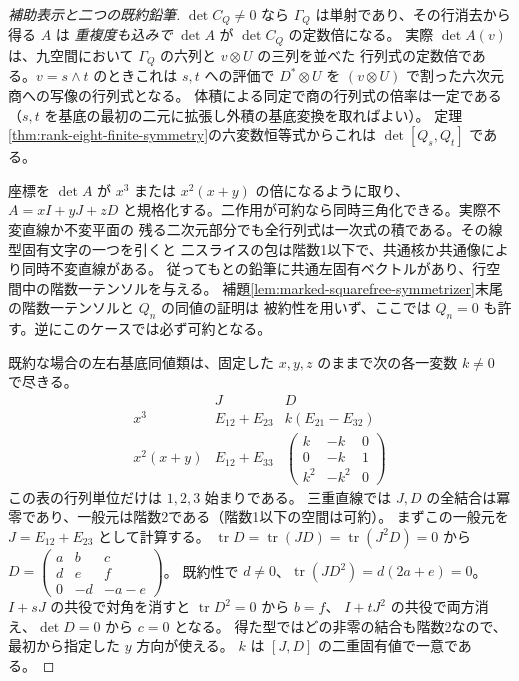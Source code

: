 \begin{proof}[補助表示と二つの既約鉛筆]
$\det C_Q\ne0$ なら $\Gamma_Q$ は単射であり、その行消去から得る $A$ は
\emph{重複度も込みで} $\det A$ が $\det C_Q$ の定数倍になる。
実際 $\det A(v)$ は、九空間において $\Gamma_Q$ の六列と $v\otimes U$ の三列を並べた
行列式の定数倍である。$v=s\wedge t$ のときこれは $s,t$ への評価で
$D^*\otimes U$ を $(v\otimes U)$ で割った六次元商への写像の行列式となる。
体積による同定で商の行列式の倍率は一定である
（$s,t$ を基底の最初の二元に拡張し外積の基底変換を取ればよい）。
定理\ref{thm:rank-eight-finite-symmetry}の六変数恒等式からこれは $\det[Q_s,Q_t]$ である。

座標を $\det A$ が $x^3$ または $x^2(x+y)$ の倍になるように取り、
$A=xI+yJ+zD$ と規格化する。二作用が可約なら同時三角化できる。実際不変直線か不変平面の
残る二次元部分でも全行列式は一次式の積である。その線型固有文字の一つを引くと
二スライスの包は階数1以下で、共通核か共通像により同時不変直線がある。
従ってもとの鉛筆に共通左固有ベクトルがあり、行空間中の階数一テンソルを与える。
補題\ref{lem:marked-squarefree-symmetrizer}末尾の階数一テンソルと $Q_n$ の同値の証明は
被約性を用いず、ここでは $Q_n=0$ も許す。逆にこのケースでは必ず可約となる。

既約な場合の左右基底同値類は、固定した $x,y,z$ のままで次の各一変数 $k\ne0$ で尽きる。
\[
\begin{array}{c|c|c}
 &J&D\\ \hline
x^3&E_{12}+E_{23}& k(E_{21}-E_{32})\\
x^2(x+y)&E_{12}+E_{33}&
\left(\begin{smallmatrix}k&-k&0\\0&-k&1\\k^2&-k^2&0\end{smallmatrix}\right)
\end{array}
\]
この表の行列単位だけは $1,2,3$ 始まりである。
三重直線では $J,D$ の全結合は冪零であり、一般元は階数2である（階数1以下の空間は可約）。
まずこの一般元を $J=E_{12}+E_{23}$ として計算する。
$\operatorname{tr}D=\operatorname{tr}(JD)=\operatorname{tr}(J^2D)=0$ から
$D=\left(\begin{smallmatrix}a&b&c\\d&e&f\\0&-d&-a-e\end{smallmatrix}\right)$。
既約性で $d\ne0$、$\operatorname{tr}(JD^2)=d(2a+e)=0$。
$I+sJ$ の共役で対角を消すと $\operatorname{tr}D^2=0$ から $b=f$、
$I+tJ^2$ の共役で両方消え、$\det D=0$ から $c=0$ となる。
得た型ではどの非零の結合も階数2なので、最初から指定した $y$ 方向が使える。
$k$ は $[J,D]$ の二重固有値で一意である。


\end{proof}
